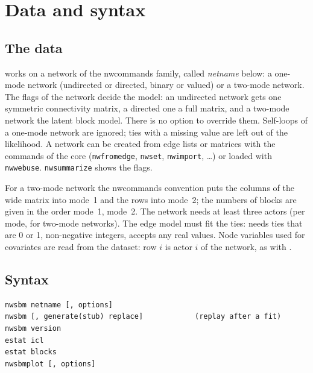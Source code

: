 \chapter{Data and syntax}\label{ch:syntax}

\section{The data}
\nwsbm{} works on a network of the nwcommands family, called \emph{netname} below: a one-mode network (undirected or directed, binary or valued) or a two-mode network. The flags of the network decide the model: an undirected network gets one symmetric connectivity matrix, a directed one a full matrix, and a two-mode network the latent block model. There is no option to override them. Self-loops of a one-mode network are ignored; ties with a missing value are left out of the likelihood. A network can be created from edge lists or matrices with the commands of the core (\texttt{nwfromedge}, \texttt{nwset}, \texttt{nwimport}, \dots) or loaded with \texttt{nwwebuse}. \texttt{nwsummarize} shows the flags.

\label{sec:twodata}For a two-mode network the nwcommands convention puts the columns of the wide matrix into mode~1 and the rows into mode~2; the numbers of blocks  are given in the order mode~1, mode~2. The network needs at least three actors (per mode, for two-mode networks). The edge model must fit the ties:  needs ties that are 0 or 1,  non-negative integers,  accepts any real values. Node variables used for covariates are read from the dataset: row $i$ is actor $i$ of the network, as with .

\section{Syntax}
\begin{lstlisting}
nwsbm netname [, options]
nwsbm [, generate(stub) replace]            (replay after a fit)
nwsbm version
estat icl
estat blocks
nwsbmplot [, options]
\end{lstlisting}

